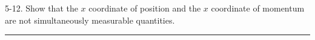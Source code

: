 \documentclass[12pt]{article}
\begin{document}
5-12.
Show that the $x$ coordinate of position and the
$x$ coordinate of momentum are not simultaneously
measurable quantities.

\bigskip
\hrule

\bigskip

\end{document}
